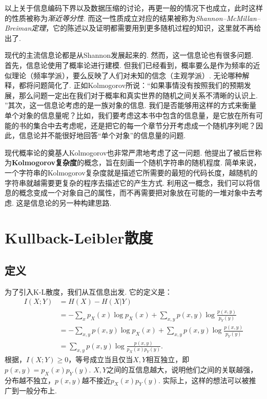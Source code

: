 以上关于信息编码下界以及数据压缩的讨论，再更一般的情况下也成立，此时这样的性质被称为\emph{渐近等分性}. 而这一性质成立对应的结果被称为\emph{Shannon–McMillan–Breiman定理}，它的陈述以及证明都需要用到更多随机过程的知识，这里就不再给出了.

\begin{remark}
现代的主流信息论都是从Shannon发展起来的. 然而，这一信息论也有很多问题. 首先，信息论使用了概率论进行建模. 但我们已经看到，概率要么是作为频率的近似理论（频率学派），要么反映了人们对未知的信念（主观学派）. 无论哪种解释，都将问题简化了. 正如Kolmogorov所说：“如果事情没有按照我们的预期发展，那么问题一定出在我们对于概率和真实世界的随机之间关系不清晰的认识上. ”其次，这一信息论考虑的是一族对象的信息. 我们是否能够用这样的方式来衡量单个对象的信息量呢？比如，我们要考虑这本书中包含的信息量，是它放在所有可能的书的集合中去考虑呢，还是把它的每一个章节分开考虑成一个随机序列呢？因此，信息论并不能很好地回答“单个对象”的信息量的问题. 

现代概率论的奠基人Kolmogorov也非常严肃地考虑了这一问题. 他提出了被后世称为\textbf{Kolmogorov复杂度}的概念，旨在刻画一个随机字符串的随机程度. 简单来说，一个字符串的Kolmogorov复杂度就是描述它所需要的最短的代码长度，越随机的字符串就越需要更复杂的程序去描述它的产生方式. 利用这一概念，我们可以将信息的概念变成一个对象自己的属性，而不再需要把对象放在可能的一堆对象中去考虑. 这是信息论的另一种构建思路. 
\end{remark}

\section{Kullback-Leibler散度}\label{sec:kl-divergence}
\subsection{定义}
为了引入K-L散度，我们从互信息出发. 它的定义是：
\begin{align*}
    I(X;Y)&=H(X)-H(X|Y)\\
    &=-\sum_{x}p_X(x)\log p_X(x)+\sum_{x,y}p(x,y)\log\frac{p(x,y)}{p_Y(y)}\\
    &=-\sum_{x,y}p(x,y)\log p_X(x)+\sum_{x,y}p(x,y)\log\frac{p(x,y)}{p_Y(y)}\\
    &=\sum_{x,y}p(x,y)\log\frac{p(x,y)}{p_X(x)p_Y(y)}.
\end{align*}
根据，$I(X;Y)\geq 0$，等号成立当且仅当$X,Y$相互独立，即$p(x,y)=p_X(x)p_Y(y)$. $X,Y$之间的互信息越大，说明他们之间的关联越强，分布越不独立，$p(x,y)$越不接近$p_X(x)p_Y(y)$. 实际上，这样的想法可以被推广到一般分布上. 

